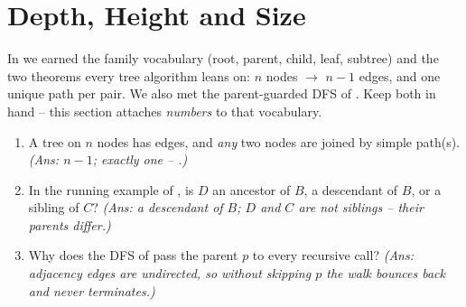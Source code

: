 \section{Depth, Height and Size}\label{sec:c01-anatomy}

\begin{previouslybox}
In  we earned the family vocabulary (root, parent, child,
leaf, subtree) and the two theorems every tree algorithm leans on: $n$ nodes $\to$
$n-1$ edges, and one unique path per pair. We also met the parent-guarded DFS of
. Keep both in hand -- this section attaches \emph{numbers} to
that vocabulary.

\begin{enumerate}[nosep, leftmargin=1.6em]
  \item A tree on $n$ nodes has \underline{\hspace{0.8cm}} edges, and \emph{any} two
        nodes are joined by \underline{\hspace{0.9cm}} simple path(s).
        \emph{(Ans: $n-1$; exactly one -- .)}
  \item In the running example of , is $D$ an ancestor of $B$, a
        descendant of $B$, or a sibling of $C$?
        \emph{(Ans: a descendant of $B$; $D$ and $C$ are not siblings -- their parents
        differ.)}
  \item Why does the DFS of  pass the parent $p$ to every recursive
        call? \emph{(Ans: adjacency edges are undirected, so without skipping $p$ the
        walk bounces back and never terminates.)}
\end{enumerate}
\end{previouslybox}

